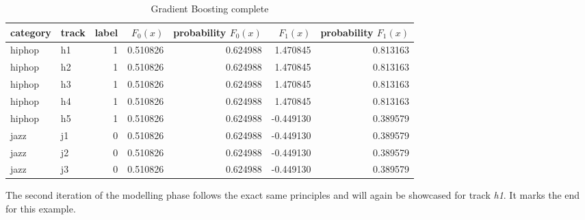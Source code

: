 \begin{table}[H]
    \centering
    \begin{tabular}{llrrrrr}
        \toprule
        category & track &  label & \(F_{0}(x)\) &  probability \(F_{0}(x)\) &  \(F_{1}(x)\) &  probability \(F_{1}(x)\) \\
        \midrule
          hiphop &    h1 &      1 & 0.510826 &         0.624988 &  1.470845 &         0.813163 \\
          hiphop &    h2 &      1 & 0.510826 &         0.624988 &  1.470845 &         0.813163 \\
          hiphop &    h3 &      1 & 0.510826 &         0.624988 &  1.470845 &         0.813163 \\
          hiphop &    h4 &      1 & 0.510826 &         0.624988 &  1.470845 &         0.813163 \\
          hiphop &    h5 &      1 & 0.510826 &         0.624988 & -0.449130 &         0.389579 \\
            jazz &    j1 &      0 & 0.510826 &         0.624988 & -0.449130 &         0.389579 \\
            jazz &    j2 &      0 & 0.510826 &         0.624988 & -0.449130 &         0.389579 \\
            jazz &    j3 &      0 & 0.510826 &         0.624988 & -0.449130 &         0.389579 \\
        \bottomrule
        \end{tabular}
    \caption{Gradient Boosting complete}%
    \label{tbl:theory_output_values_1_iteration}%
  \end{table} 

The second iteration of the modelling phase follows the exact same principles and will again be showcased for track \emph{h1}. 
It marks the end for this example. 

